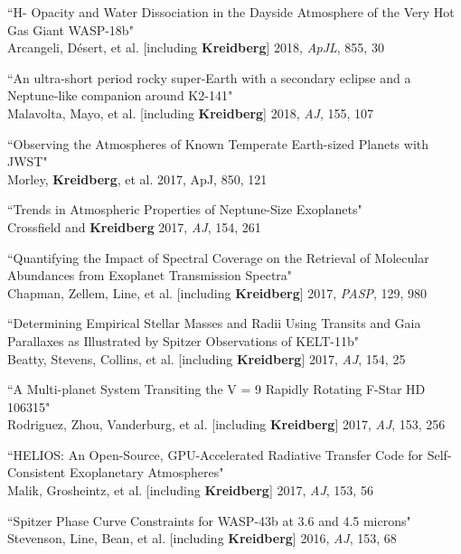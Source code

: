 \documentclass[12pt,letterpaper]{article}
\begin{document}
\begin{compactenum}
\item ``H- Opacity and Water Dissociation in the Dayside Atmosphere of the Very Hot Gas Giant WASP-18b"\\
	Arcangeli, D\'{e}sert, et al. [including \textbf{Kreidberg}] 2018, \textit{ApJL}, 855, 30 

\item ``An ultra-short period rocky super-Earth with a secondary eclipse and a Neptune-like companion around K2-141"\\
Malavolta, Mayo, et al. [including \textbf{Kreidberg}] 2018, \textit{AJ}, 155, 107 

\item ``Observing the Atmospheres of Known Temperate Earth-sized Planets with JWST"\\
Morley, \textbf{Kreidberg}, et al. 2017, ApJ, 850, 121 

\item ``Trends in Atmospheric Properties of Neptune-Size Exoplanets"\\
Crossfield and \textbf{Kreidberg} 2017, \textit{AJ}, 154, 261 

\item ``Quantifying the Impact of Spectral Coverage on the Retrieval of Molecular Abundances from Exoplanet Transmission Spectra"\\
Chapman, Zellem, Line, et al. [including \textbf{Kreidberg}] 2017, \textit{PASP}, 129, 980

\item ``Determining Empirical Stellar Masses and Radii Using Transits and Gaia Parallaxes as Illustrated by Spitzer Observations of KELT-11b"\\
Beatty, Stevens, Collins, et al. [including \textbf{Kreidberg}] 2017, \textit{AJ}, 154, 25 

\item ``A Multi-planet System Transiting the V = 9 Rapidly Rotating F-Star HD 106315"\\
Rodriguez, Zhou, Vanderburg, et al. [including \textbf{Kreidberg}] 2017, \textit{AJ}, 153, 256

\item ``HELIOS: An Open-Source, GPU-Accelerated Radiative Transfer Code for Self-Consistent Exoplanetary Atmospheres"\\
Malik, Grosheintz,  et al. [including \textbf{Kreidberg}] 2017, \textit{AJ}, 153, 56 

\item ``Spitzer Phase Curve Constraints for WASP-43b at 3.6 and 4.5 microns"\\
Stevenson, Line, Bean, et al. [including \textbf{Kreidberg}] 2016, \textit{AJ}, 153, 68 


\end{compactenum}
\end{document}
